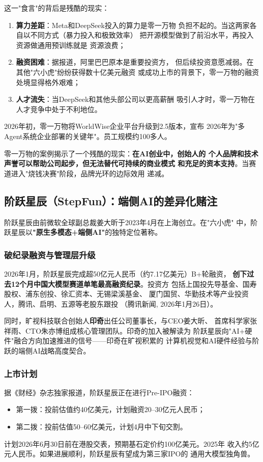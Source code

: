 这一"食言"的背后是残酷的现实：
\begin{enumerate}
  \item \textbf{算力差距}：Meta和DeepSeek投入的算力是零一万物
    负担不起的。当这两家各自以不同方式（暴力投入和极致效率）
    把开源模型做到了前沿水平，再投入资源做通用预训练就是
    资源浪费；
  \item \textbf{融资困难}：据报道，阿里巴巴原本是重要投资方，
    但后续投资意愿减弱。在其他"六小虎"纷纷获得数十亿美元融资
    或成功上市的背景下，零一万物的融资处境显得格外艰难；
  \item \textbf{人才流失}：当DeepSeek和其他头部公司以更高薪酬
    吸引人才时，零一万物在人才竞争中处于不利地位。
\end{enumerate}

2026年初，零一万物将WorldWise企业平台升级到2.5版本，宣布
2026年为"多Agent系统企业部署的关键年"。员工规模约100多人。

零一万物的案例揭示了一个残酷的现实：\textbf{在AI创业中，创始人的
个人品牌和技术声誉可以帮助公司起步，但无法替代可持续的商业模式
和充足的资本支持}。当赛道进入"烧钱决赛"阶段，品牌光环的边际效用
递减。

\subsection{阶跃星辰（StepFun）：端侧AI的差异化赌注}
\label{subsec:stepfun}

阶跃星辰由前微软全球副总裁姜大昕于2023年4月在上海创立。在"六小虎"
中，阶跃星辰以\textbf{"原生多模态+端侧AI"}的独特定位著称。

\subsubsection{破纪录融资与管理层升级}
2026年1月，阶跃星辰完成超50亿元人民币（约7.17亿美元）B+轮融资，
\textbf{创下过去12个月中国大模型赛道单笔最高融资纪录}。投资方
包括上国投先导基金、国寿股权、浦东创投、徐汇资本、无锡梁溪基金、
厦门国贸、华勤技术等产业投资人，腾讯、启明、五源等老股东跟投
（腾讯新闻, 2026年1月26日）。

同时，旷视科技联合创始人\textbf{印奇}出任公司董事长，与CEO姜大昕、
首席科学家张祥雨、CTO朱亦博组成核心管理团队。印奇的加入被解读为
阶跃星辰向"AI+硬件"融合方向加速推进的信号——印奇在旷视积累的
计算机视觉和AI硬件经验与阶跃的端侧AI战略高度契合。

\subsubsection{上市计划}
据《财经》杂志独家报道，阶跃星辰正在进行Pre-IPO融资：
\begin{itemize}
  \item 第一拨：投前估值约40亿美元，计划融资20--30亿元人民币；
  \item 第二拨：投前估值50--60亿美元，计划4月中下旬交割。
\end{itemize}
计划2026年6月30日前在港股交表，预期基石定价约100亿美元。2025年
收入约5亿元人民币。如果进展顺利，阶跃星辰有望成为第三家IPO的
通用大模型独角兽。

